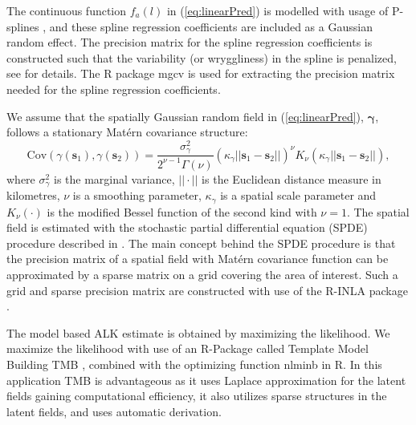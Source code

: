 \documentclass[a4paper 12pt]{article}
\numberwithin{equation}{section}
\begin{document}
The continuous function $f_a(l)$ in (\ref{eq:linearPred}) is modelled with usage of P-splines \citep{wood2017generalized}, and these spline regression coefficients are included as a Gaussian random effect. The precision matrix for the spline regression coefficients is constructed such that the variability (or wryggliness) in the spline is penalized, see \citet[page 239]{wood2017generalized} for details. The R package mgcv \citep{wood2015package} is used for extracting the precision matrix needed for the spline regression coefficients.

\indent We assume that the spatially Gaussian random field in (\ref{eq:linearPred}), $\pmb{\gamma}$, follows a stationary Mat\'{e}rn covariance structure:
\begin{equation}\label{eq:matern}
 \text{Cov}(\gamma(\mathbf{s}_1),\gamma(\mathbf{s}_2)) = \frac{\sigma^2_{\gamma}}{2^{\nu-1}\Gamma(\nu)}(\kappa_{\gamma}||\mathbf{s}_1 -\mathbf{s}_2||)^{\nu}K_{\nu}(\kappa_{\gamma}||\mathbf{s}_1-\mathbf{s}_2||),
\end{equation}
where $\sigma^2_{\gamma}$ is the marginal variance, $||\cdot||$ is the Euclidean distance measure in kilometres, $\nu$ is a smoothing parameter, $\kappa_{\gamma}$ is a spatial scale parameter and $K_{\nu}(\cdot)$ is the modified Bessel function of the second kind with $\nu = 1$. The spatial field is estimated with the stochastic partial differential equation (SPDE) procedure described in \citet{lindgren2011explicit}. The main concept behind the SPDE procedure is that the precision matrix of a spatial field with Mat\'{e}rn  covariance function can be approximated by a sparse matrix on a grid covering the area of interest. Such a grid and sparse precision matrix are constructed with use of the R-INLA package \citep{rue2009approximate}.

The model based ALK estimate is obtained by maximizing the likelihood. We maximize the likelihood with use of an R-Package called Template Model Building {\sffamily TMB} \citep{kristensen2015tmb}, combined with the optimizing function {\sffamily nlminb} in R. In this application {\sffamily TMB} is advantageous as it uses Laplace approximation for the latent fields gaining computational efficiency, it also utilizes sparse structures in the latent fields, and uses automatic derivation. 
\end{document}
